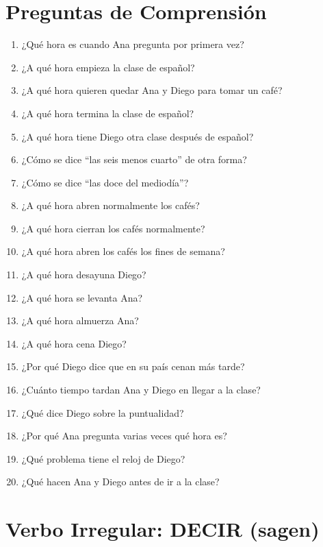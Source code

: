 \documentclass[12pt,a4paper]{article}
\begin{document}
\newpage

\section*{Preguntas de Comprensión}

\begin{enumerate}[leftmargin=*]
    \item ¿Qué hora es cuando Ana pregunta por primera vez?
    \item ¿A qué hora empieza la clase de español?
    \item ¿A qué hora quieren quedar Ana y Diego para tomar un café?
    \item ¿A qué hora termina la clase de español?
    \item ¿A qué hora tiene Diego otra clase después de español?
    \item ¿Cómo se dice \enquote{las seis menos cuarto} de otra forma?
    \item ¿Cómo se dice \enquote{las doce del mediodía}?
    \item ¿A qué hora abren normalmente los cafés?
    \item ¿A qué hora cierran los cafés normalmente?
    \item ¿A qué hora abren los cafés los fines de semana?
    \item ¿A qué hora desayuna Diego?
    \item ¿A qué hora se levanta Ana?
    \item ¿A qué hora almuerza Ana?
    \item ¿A qué hora cena Diego?
    \item ¿Por qué Diego dice que en su país cenan más tarde?
    \item ¿Cuánto tiempo tardan Ana y Diego en llegar a la clase?
    \item ¿Qué dice Diego sobre la puntualidad?
    \item ¿Por qué Ana pregunta varias veces qué hora es?
    \item ¿Qué problema tiene el reloj de Diego?
    \item ¿Qué hacen Ana y Diego antes de ir a la clase?
\end{enumerate}

\newpage

\section*{Verbo Irregular: DECIR (sagen)}
\end{document}
